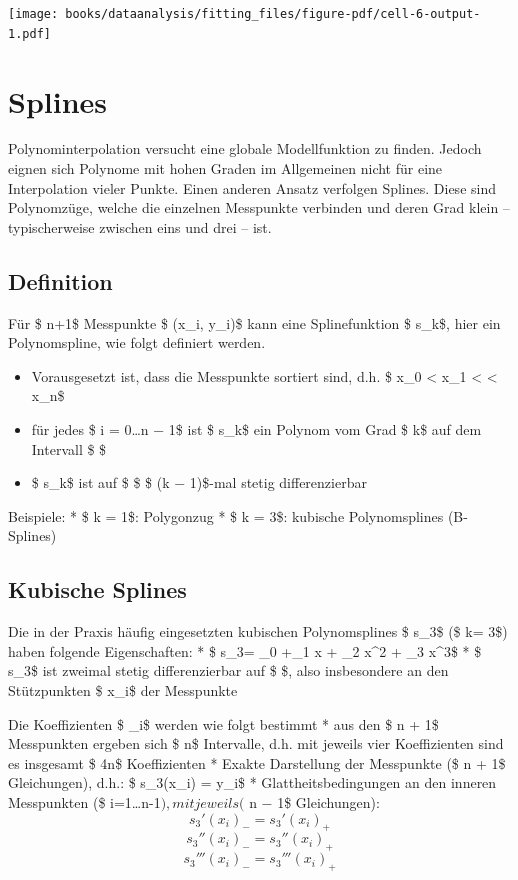 \documentclass[
  letterpaper,
  DIV=11,
  numbers=noendperiod]{scrreprt}
\providecommand{\tightlist}{%
  \setlength{\itemsep}{0pt}\setlength{\parskip}{0pt}}\usepackage{longtable,booktabs,array}
\begin{document}
\texttt{[image: books/dataanalysis/fitting\_files/figure-pdf/cell-6-output-1.pdf]}

\chapter{Splines}\label{splines}

Polynominterpolation versucht eine globale Modellfunktion zu finden.
Jedoch eignen sich Polynome mit hohen Graden im Allgemeinen nicht für
eine Interpolation vieler Punkte. Einen anderen Ansatz verfolgen
Splines. Diese sind Polynomzüge, welche die einzelnen Messpunkte
verbinden und deren Grad klein -- typischerweise zwischen eins und drei
-- ist.

\section{Definition}\label{definition}

Für \$ n+1\$ Messpunkte \$ (x\_i, y\_i)\$ kann eine Splinefunktion \$
s\_k\$, hier ein Polynomspline, wie folgt definiert werden.

\begin{itemize}
\tightlist
\item
  Vorausgesetzt ist, dass die Messpunkte sortiert sind, d.h. \$ x\_0
  \textless{} x\_1 \textless{} \cdots \textless{} x\_n\$
\item
  für jedes \$ i = 0\dots n − 1\$ ist \$ s\_k\$ ein Polynom vom Grad \$
  k\$ auf dem Intervall \$ \left[x_i , x_{i+1}\right]\$
\item
  \$ s\_k\$ ist auf \$ \left[x_0 , x_n \right]\$ \$ (k − 1)\$-mal stetig
  differenzierbar
\end{itemize}

Beispiele: * \$ k = 1\$: Polygonzug * \$ k = 3\$: kubische
Polynomsplines (B-Splines)

\section{Kubische Splines}\label{kubische-splines}

Die in der Praxis häufig eingesetzten kubischen Polynomsplines \$ s\_3\$
(\$ k= 3\$) haben folgende Eigenschaften: * \$
s\_3\textbar{}\left[x_i,x_{i+1}\right] = \beta\_0 +\beta\_1 x + \beta\_2
x\^{}2 + \beta\_3 x\^{}3\$ * \$ s\_3\$ ist zweimal stetig
differenzierbar auf \$ \left[x_0,x_n\right]\$, also insbesondere an den
Stützpunkten \$ x\_i\$ der Messpunkte

Die Koeffizienten \$ \beta\_i\$ werden wie folgt bestimmt * aus den \$ n
+ 1\$ Messpunkten ergeben sich \$ n\$ Intervalle, d.h. mit jeweils vier
Koeffizienten sind es insgesamt \$ 4n\$ Koeffizienten * Exakte
Darstellung der Messpunkte (\$ n + 1\$ Gleichungen), d.h.: \$ s\_3(x\_i)
= y\_i\$ * Glattheitsbedingungen an den inneren Messpunkten (\$
i=1\dots n-1\(), mit jeweils (\) n − 1\$ Gleichungen):
\[ s_3'(x_i)_- =s_3'(x_i)_+\] \[ s_3''(x_i)_- =s_3''(x_i)_+\]
\[ s_3'''(x_i)_- =s_3'''(x_i)_+\]
\end{document}
